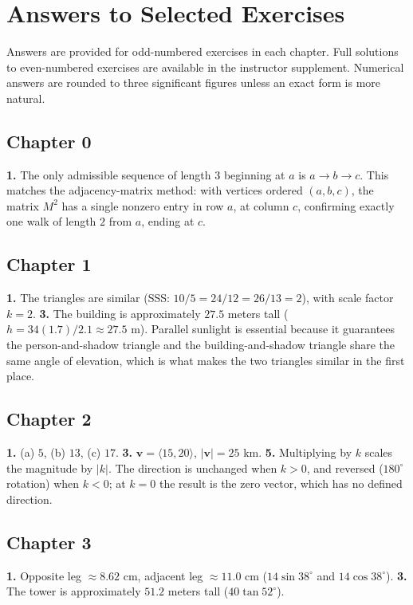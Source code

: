 \chapter{Answers to Selected Exercises}
\label{app:answers}

Answers are provided for odd-numbered exercises in each chapter. Full
solutions to even-numbered exercises are available in the instructor
supplement. Numerical answers are rounded to three significant figures
unless an exact form is more natural.

\section*{Chapter 0}
\textbf{1.} The only admissible sequence of length $3$ beginning at $a$
is $a \to b \to c$. This matches the adjacency-matrix method: with
vertices ordered $(a,b,c)$, the matrix $M^2$ has a single nonzero entry
in row $a$, at column $c$, confirming exactly one walk of length $2$ from
$a$, ending at $c$.

\section*{Chapter 1}
\textbf{1.} The triangles are similar (SSS: $10/5 = 24/12 = 26/13 = 2$),
with scale factor $k = 2$. \quad
\textbf{3.} The building is approximately $27.5$ meters tall
($h = 34(1.7)/2.1 \approx 27.5$ m). Parallel sunlight is essential
because it guarantees the person-and-shadow triangle and the
building-and-shadow triangle share the same angle of elevation, which is
what makes the two triangles similar in the first place.

\section*{Chapter 2}
\textbf{1.} (a) $5$, (b) $13$, (c) $17$. \quad
\textbf{3.} $\mathbf{v} = \langle 15, 20 \rangle$, $|\mathbf{v}| = 25$ km.
\quad
\textbf{5.} Multiplying by $k$ scales the magnitude by $|k|$. The
direction is unchanged when $k > 0$, and reversed ($180^\circ$ rotation)
when $k < 0$; at $k=0$ the result is the zero vector, which has no
defined direction.

\section*{Chapter 3}
\textbf{1.} Opposite leg $\approx 8.62$ cm, adjacent leg $\approx 11.0$
cm ($14\sin38^\circ$ and $14\cos38^\circ$). \quad
\textbf{3.} The tower is approximately $51.2$ meters tall ($40\tan
52^\circ$).

